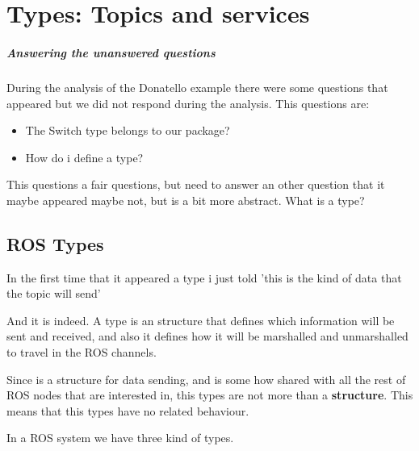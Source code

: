 \documentclass[a4paper,10pt,twoside]{book}
\begin{document}
\fi
\sloppy
\chapter{Types: Topics and services }

				\paragraph{Answering the unanswered questions \newline\newline}
				During the analysis of the Donatello example there were some questions that appeared but we did not respond during the analysis. This questions are:
				
				\begin{itemize}	
					\item The Switch type belongs to our package?
					\item How do i define a type?
				\end{itemize}
			
				This questions a fair questions, but need to answer an other question that it maybe appeared maybe not, but is a bit more abstract. What is a type? 
				
				\section{ROS Types}
				
				In the first time that it appeared a type i just told 'this is the kind of data that the topic will send' 
				
				And it is indeed. A type is an structure that defines which information will be sent and received, and also it defines how it will be marshalled and unmarshalled to travel in the ROS channels. 

				Since is a structure for data sending, and is some how shared with all the rest of ROS nodes that are interested in, this types are not more than a \textbf{structure}. This means that this types have no related behaviour. 
				
				
				In a ROS system we have three kind of types. 
				
\end{document}
